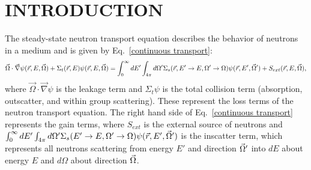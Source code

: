 %
%
%
%



\pagestyle{plain} %
\setcounter{page}{1}


\chapter{\uppercase {Introduction}}

The steady-state neutron transport equation describes the behavior of neutrons in a medium and is given by Eq.~\eqref{continuous transport}:
\begin{equation}
\vec{\Omega} \cdot \vec \nabla \psi(\vec{r},E,\vec{\Omega}) +\Sigma_t(\vec{r},E) \psi(\vec{r},E,\vec{\Omega})  =
\int_{0}^{\infty}dE' \int_{4\pi}d\Omega' \Sigma_s(\vec{r},E'\to E, \Omega'\to\Omega)\psi(\vec{r},E',\vec{\Omega}') 
+ S_{ext}(\vec{r},E,\vec{\Omega}) ,
\label{continuous transport}
\end{equation}
where $\vec{\Omega}\cdot \vec\nabla\psi$ is the leakage term and $\Sigma_t\psi$ is the total collision term (absorption, outscatter, and within group scattering). These represent the loss terms of the neutron transport equation. The right hand side of Eq.~\eqref{continuous transport} represents the gain terms, where $S_{ext}$ is the external source of neutrons and $\int_{0}^{\infty}dE'\int_{4\pi}d\Omega'\Sigma_s(E'\to E, \Omega'\to\Omega)\psi(\vec{r},E',\vec{\Omega}')$ is the inscatter term, which represents all neutrons scattering from energy $E'$ and direction $\vec{\Omega}'$ into $dE$ about energy $E$ and $d\Omega$ about direction $\vec{\Omega}$.

